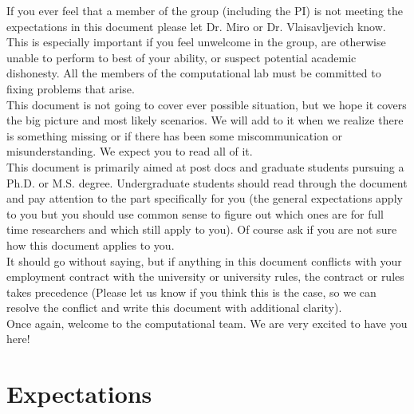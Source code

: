 \documentclass[letterpaper]{article}
\begin{document}
If you ever feel that a member of the group (including the PI) is not meeting the expectations in this document please let Dr. Miro or Dr. Vlaisavljevich know. This is especially important if you feel unwelcome in the group, are otherwise unable to perform to best of your ability, or suspect potential academic dishonesty. All the members of the computational lab must be committed to fixing problems that arise.\\

This document is not going to cover ever possible situation, but we hope it covers the big picture and most likely scenarios. We will add to it when we realize there is something missing or if there has been some miscommunication or misunderstanding. We expect you to read all of it.\\

This document is primarily aimed at post docs and graduate students pursuing a Ph.D. or M.S. degree. Undergraduate students should read through the document and pay attention to the part specifically for you (the general expectations apply to you but you should use common sense to figure out which ones are for full time researchers and which still apply to you). Of course ask if you are not sure how this document applies to you.\\

It should go without saying, but if anything in this document conflicts with your employment contract with the university or university rules, the contract or rules takes precedence (Please let us know if you think this is the case, so we can resolve the conflict and write this document with additional clarity).\\

Once again, welcome to the computational team. We are very excited to have you here!

\section{Expectations}
\end{document}
